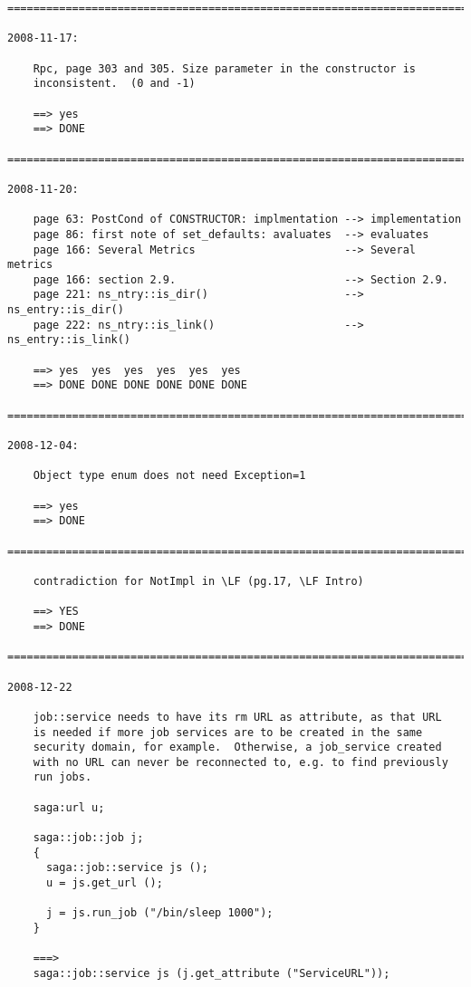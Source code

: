 \documentclass{article}
\begin{document}
\begin{verbatim}
=========================================================================

2008-11-17:

    Rpc, page 303 and 305. Size parameter in the constructor is
    inconsistent.  (0 and -1)

    ==> yes
    ==> DONE

=========================================================================

2008-11-20:

    page 63: PostCond of CONSTRUCTOR: implmentation --> implementation
    page 86: first note of set_defaults: avaluates  --> evaluates
    page 166: Several Metrics                       --> Several metrics
    page 166: section 2.9.                          --> Section 2.9.
    page 221: ns_ntry::is_dir()                     --> ns_entry::is_dir()
    page 222: ns_ntry::is_link()                    --> ns_entry::is_link()

    ==> yes  yes  yes  yes  yes  yes
    ==> DONE DONE DONE DONE DONE DONE

=========================================================================

2008-12-04:

    Object type enum does not need Exception=1

    ==> yes
    ==> DONE

=========================================================================

    contradiction for NotImpl in \LF (pg.17, \LF Intro)

    ==> YES
    ==> DONE
    
=========================================================================

2008-12-22

    job::service needs to have its rm URL as attribute, as that URL
    is needed if more job services are to be created in the same
    security domain, for example.  Otherwise, a job_service created
    with no URL can never be reconnected to, e.g. to find previously
    run jobs.

    saga:url u;

    saga::job::job j;
    {
      saga::job::service js ();
      u = js.get_url ();
    
      j = js.run_job ("/bin/sleep 1000");
    }

    ===> 
    saga::job::service js (j.get_attribute ("ServiceURL"));


\end{verbatim}
\end{document}
